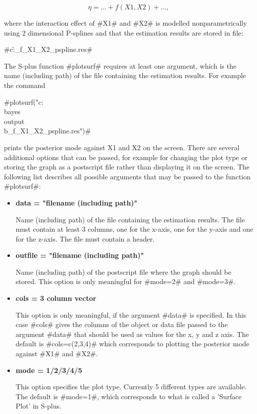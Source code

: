 $$
\eta = \dots + f(X1,X2) + \dots,
$$

where the interaction effect of #X1# and #X2# is modelled
nonparametrically using 2 dimensional P-splines and that the
estimation results are stored in file:

#c:\bayes\output\r_f_X1_X2_pspline.res#

The S-plus function #plotsurf# requires at least one argument,
which is the name (including path) of the file containing the
estimation results. For example the command

#plotsurf("c:\\bayes\\output\\b_f_X1_X2_pspline.res")#

prints the posterior mode against X1 and X2 on the screen. There
are several additional options that can be passed, for example for
changing the plot type or storing the graph as a postscript file
rather than displaying it on the screen. The following list
describes all possible arguments that may be passed to the
function #plotsurf#:

\begin{itemize}
\item {\bf data = "filename (including path)"}

Name (including path) of the file containing the estimation
results. The file must contain at least 3 columns, one for the
x-axis, one for the y-axis and one for the z-axis. The file must
contain a header.
\item {\bf outfile = "filename (including path)"}

Name (including path) of the postscript file where the graph
should be stored. This option is only meaningful for #mode=2# and
#mode=3#. \item {\bf cols = 3 column vector}

This option is only meaningful, if the argument #data# is
specified. In this case #cols# gives the columns of the object or
data file passed to the argument #data# that should be used as
values for the x, y and z axis. The default is #cols=c(2,3,4)#
which corresponds to plotting the posterior mode against #X1# and
#X2#.

\item {\bf mode = 1/2/3/4/5}

This option specifies the plot type. Currently 5 different types
are available. The default is #mode=1#, which corresponds to what
is called a 'Surface Plot' in S-plus.
\end{itemize}


